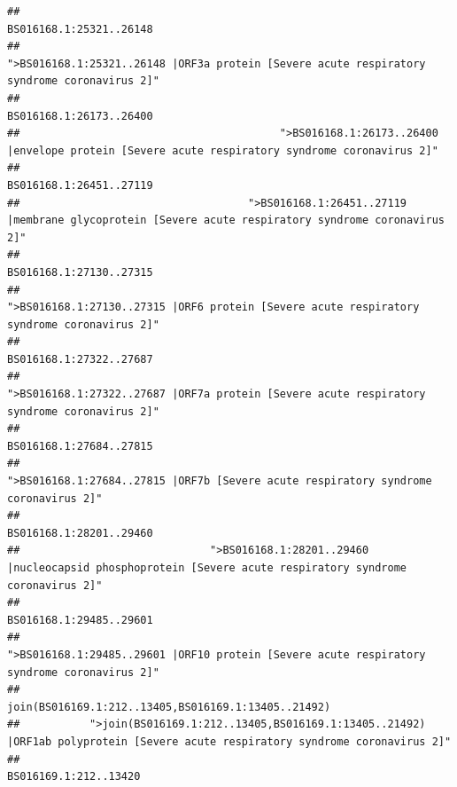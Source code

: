 \documentclass[
]{article}
\begin{document}
\begin{verbatim}
##                                                                                                                BS016168.1:25321..26148 
##                                            ">BS016168.1:25321..26148 |ORF3a protein [Severe acute respiratory syndrome coronavirus 2]" 
##                                                                                                                BS016168.1:26173..26400 
##                                         ">BS016168.1:26173..26400 |envelope protein [Severe acute respiratory syndrome coronavirus 2]" 
##                                                                                                                BS016168.1:26451..27119 
##                                    ">BS016168.1:26451..27119 |membrane glycoprotein [Severe acute respiratory syndrome coronavirus 2]" 
##                                                                                                                BS016168.1:27130..27315 
##                                             ">BS016168.1:27130..27315 |ORF6 protein [Severe acute respiratory syndrome coronavirus 2]" 
##                                                                                                                BS016168.1:27322..27687 
##                                            ">BS016168.1:27322..27687 |ORF7a protein [Severe acute respiratory syndrome coronavirus 2]" 
##                                                                                                                BS016168.1:27684..27815 
##                                                    ">BS016168.1:27684..27815 |ORF7b [Severe acute respiratory syndrome coronavirus 2]" 
##                                                                                                                BS016168.1:28201..29460 
##                              ">BS016168.1:28201..29460 |nucleocapsid phosphoprotein [Severe acute respiratory syndrome coronavirus 2]" 
##                                                                                                                BS016168.1:29485..29601 
##                                            ">BS016168.1:29485..29601 |ORF10 protein [Severe acute respiratory syndrome coronavirus 2]" 
##                                                                                    join(BS016169.1:212..13405,BS016169.1:13405..21492) 
##           ">join(BS016169.1:212..13405,BS016169.1:13405..21492) |ORF1ab polyprotein [Severe acute respiratory syndrome coronavirus 2]" 
##                                                                                                                  BS016169.1:212..13420 

\end{verbatim}
\end{document}
